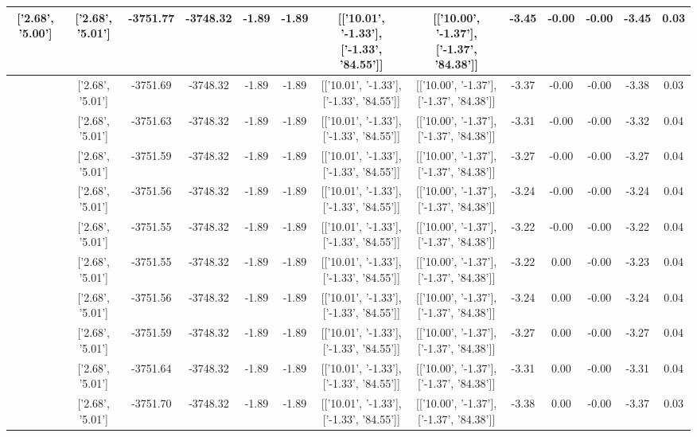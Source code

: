 \begin{table}[htbp]
\begin{adjustbox}{angle=90}
\begin{tabular}{|c|c|c|c|c|c|c|c|c|c|c|c|c|}
 ['2.68', '5.00'] & ['2.68', '5.01'] & -3751.77 & -3748.32 & -1.89 & -1.89 & [['10.01', '-1.33'], ['-1.33', '84.55']] & [['10.00', '-1.37'], ['-1.37', '84.38']] & -3.45 & -0.00 & -0.00 & -3.45 & 0.03\\ \hline
 ['2.68', '5.00'] & ['2.68', '5.01'] & -3751.69 & -3748.32 & -1.89 & -1.89 & [['10.01', '-1.33'], ['-1.33', '84.55']] & [['10.00', '-1.37'], ['-1.37', '84.38']] & -3.37 & -0.00 & -0.00 & -3.38 & 0.03\\ \hline
 ['2.68', '5.00'] & ['2.68', '5.01'] & -3751.63 & -3748.32 & -1.89 & -1.89 & [['10.01', '-1.33'], ['-1.33', '84.55']] & [['10.00', '-1.37'], ['-1.37', '84.38']] & -3.31 & -0.00 & -0.00 & -3.32 & 0.04\\ \hline
 ['2.68', '5.00'] & ['2.68', '5.01'] & -3751.59 & -3748.32 & -1.89 & -1.89 & [['10.01', '-1.33'], ['-1.33', '84.55']] & [['10.00', '-1.37'], ['-1.37', '84.38']] & -3.27 & -0.00 & -0.00 & -3.27 & 0.04\\ \hline
 ['2.68', '5.01'] & ['2.68', '5.01'] & -3751.56 & -3748.32 & -1.89 & -1.89 & [['10.01', '-1.33'], ['-1.33', '84.55']] & [['10.00', '-1.37'], ['-1.37', '84.38']] & -3.24 & -0.00 & -0.00 & -3.24 & 0.04\\ \hline
 ['2.68', '5.01'] & ['2.68', '5.01'] & -3751.55 & -3748.32 & -1.89 & -1.89 & [['10.01', '-1.33'], ['-1.33', '84.55']] & [['10.00', '-1.37'], ['-1.37', '84.38']] & -3.22 & -0.00 & -0.00 & -3.22 & 0.04\\ \hline
 ['2.68', '5.01'] & ['2.68', '5.01'] & -3751.55 & -3748.32 & -1.89 & -1.89 & [['10.01', '-1.33'], ['-1.33', '84.55']] & [['10.00', '-1.37'], ['-1.37', '84.38']] & -3.22 & 0.00 & -0.00 & -3.23 & 0.04\\ \hline
 ['2.69', '5.01'] & ['2.68', '5.01'] & -3751.56 & -3748.32 & -1.89 & -1.89 & [['10.01', '-1.33'], ['-1.33', '84.55']] & [['10.00', '-1.37'], ['-1.37', '84.38']] & -3.24 & 0.00 & -0.00 & -3.24 & 0.04\\ \hline
 ['2.69', '5.01'] & ['2.68', '5.01'] & -3751.59 & -3748.32 & -1.89 & -1.89 & [['10.01', '-1.33'], ['-1.33', '84.55']] & [['10.00', '-1.37'], ['-1.37', '84.38']] & -3.27 & 0.00 & -0.00 & -3.27 & 0.04\\ \hline
 ['2.69', '5.01'] & ['2.68', '5.01'] & -3751.64 & -3748.32 & -1.89 & -1.89 & [['10.01', '-1.33'], ['-1.33', '84.55']] & [['10.00', '-1.37'], ['-1.37', '84.38']] & -3.31 & 0.00 & -0.00 & -3.31 & 0.04\\ \hline
 ['2.69', '5.01'] & ['2.68', '5.01'] & -3751.70 & -3748.32 & -1.89 & -1.89 & [['10.01', '-1.33'], ['-1.33', '84.55']] & [['10.00', '-1.37'], ['-1.37', '84.38']] & -3.38 & 0.00 & -0.00 & -3.37 & 0.03\\ \hline

\end{tabular}
\end{adjustbox}
\end{table}
